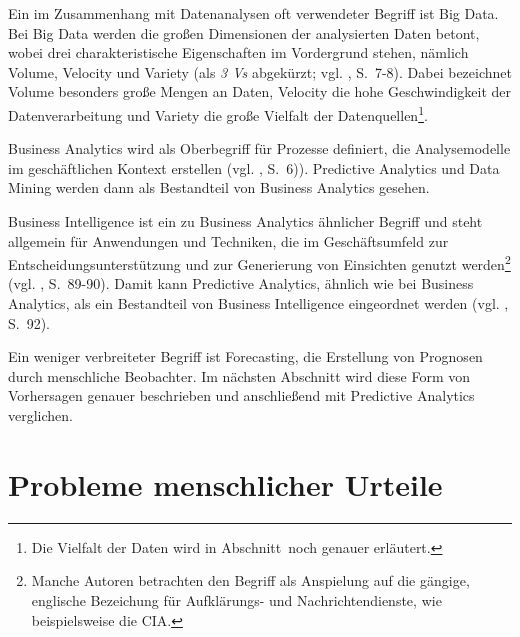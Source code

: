 Ein im Zusammenhang mit Datenanalysen oft verwendeter Begriff ist Big Data.
Bei Big Data werden die großen Dimensionen der analysierten Daten betont, wobei
drei charakteristische Eigenschaften im Vordergrund stehen, nämlich Volume, Velocity 
und Variety (als \emph{3 Vs} abgekürzt; vgl. \cite{McCarthy}, S.~7-8). Dabei bezeichnet Volume
besonders große Mengen an Daten, Velocity die hohe Geschwindigkeit der Datenverarbeitung
und Variety die große Vielfalt der Datenquellen\footnote{
Die Vielfalt der Daten wird in Abschnitt~\xcom noch genauer erläutert.
}. 

Business Analytics wird als Oberbegriff für Prozesse definiert, die
Analysemodelle im geschäftlichen Kontext erstellen (vgl. \cite{McCarthy}, S.~6)). 
Predictive Analytics und Data Mining werden dann als Bestandteil von Business Analytics
gesehen. 

Business Intelligence ist ein zu Business Analytics ähnlicher
Begriff und steht allgemein für Anwendungen und Techniken, die im
Geschäftsumfeld zur Entscheidungsunterstützung und zur Generierung von
Einsichten genutzt werden\footnote{
Manche Autoren betrachten den Begriff \grqq{} als Anspielung
auf die gängige, englische Bezeichung für Aufklärungs- und Nachrichtendienste,
wie beispielsweise die CIA.
} (vgl. \cite{Gluchowski}, S.~89-90). Damit kann Predictive Analytics,
ähnlich wie bei Business Analytics, als ein Bestandteil von 
Business Intelligence eingeordnet werden (vgl. \cite{Gluchowski}, S.~92). 

Ein weniger verbreiteter Begriff ist Forecasting,
die Erstellung von Prognosen durch menschliche Beobachter. Im nächsten Abschnitt
wird diese Form von Vorhersagen genauer beschrieben und anschließend mit
Predictive Analytics verglichen.  

\section{Probleme menschlicher Urteile}


